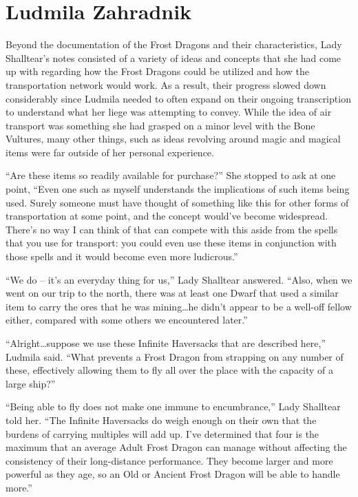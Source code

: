 \chapter{Ludmila Zahradnik}

Beyond the documentation of the Frost Dragons and their characteristics, Lady Shalltear’s notes consisted of a variety of ideas and concepts that she had come up with regarding how the Frost Dragons could be utilized and how the transportation network would work. As a result, their progress slowed down considerably since Ludmila needed to often expand on their ongoing transcription to understand what her liege was attempting to convey. While the idea of air transport was something she had grasped on a minor level with the Bone Vultures, many other things, such as ideas revolving around magic and magical items were far outside of her personal experience.

 

“Are these items so readily available for purchase?” She stopped to ask at one point, “Even one such as myself understands the implications of such items being used. Surely someone must have thought of something like this for other forms of transportation at some point, and the concept would’ve become widespread. There’s no way I can think of that can compete with this aside from the spells that you use for transport: you could even use these items in conjunction with those spells and it would become even more ludicrous.”

 

“We do – it’s an everyday thing for us,” Lady Shalltear answered. “Also, when we went on our trip to the north, there was at least one Dwarf that used a similar item to carry the ores that he was mining…he didn’t appear to be a well-off fellow either, compared with some others we encountered later.”

 

“Alright…suppose we use these Infinite Haversacks that are described here,” Ludmila said. “What prevents a Frost Dragon from strapping on any number of these, effectively allowing them to fly all over the place with the capacity of a large ship?”

 

“Being able to fly does not make one immune to encumbrance,” Lady Shalltear told her. “The Infinite Haversacks do weigh enough on their own that the burdens of carrying multiples will add up. I’ve determined that four is the maximum that an average Adult Frost Dragon can manage without affecting the consistency of their long-distance performance. They become larger and more powerful as they age, so an Old or Ancient Frost Dragon will be able to handle more.”

